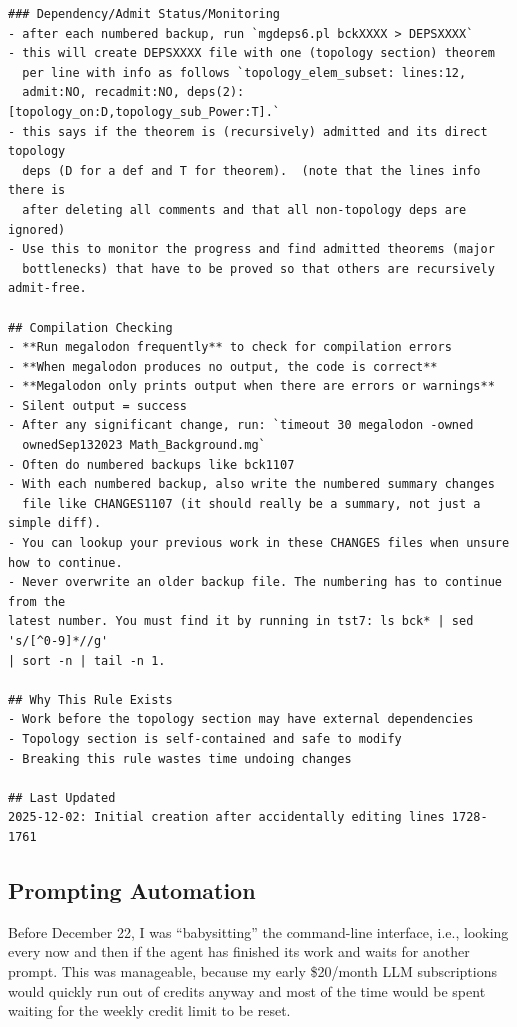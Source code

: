 \documentclass[a4paper,UKenglish,cleveref, autoref, thm-restate]{lipics-v2021}
\begin{document}
\begin{small}
\begin{verbatim}
### Dependency/Admit Status/Monitoring
- after each numbered backup, run `mgdeps6.pl bckXXXX > DEPSXXXX`
- this will create DEPSXXXX file with one (topology section) theorem
  per line with info as follows `topology_elem_subset: lines:12,
  admit:NO, recadmit:NO, deps(2):[topology_on:D,topology_sub_Power:T].`
- this says if the theorem is (recursively) admitted and its direct topology
  deps (D for a def and T for theorem).  (note that the lines info there is
  after deleting all comments and that all non-topology deps are ignored)
- Use this to monitor the progress and find admitted theorems (major
  bottlenecks) that have to be proved so that others are recursively admit-free.

## Compilation Checking
- **Run megalodon frequently** to check for compilation errors
- **When megalodon produces no output, the code is correct**
- **Megalodon only prints output when there are errors or warnings**
- Silent output = success
- After any significant change, run: `timeout 30 megalodon -owned
  ownedSep132023 Math_Background.mg`
- Often do numbered backups like bck1107
- With each numbered backup, also write the numbered summary changes
  file like CHANGES1107 (it should really be a summary, not just a simple diff).
- You can lookup your previous work in these CHANGES files when unsure how to continue.
- Never overwrite an older backup file. The numbering has to continue from the
latest number. You must find it by running in tst7: ls bck* | sed 's/[^0-9]*//g'
| sort -n | tail -n 1.

## Why This Rule Exists
- Work before the topology section may have external dependencies
- Topology section is self-contained and safe to modify
- Breaking this rule wastes time undoing changes

## Last Updated
2025-12-02: Initial creation after accidentally editing lines 1728-1761
\end{verbatim}
\end{small}  

\subsection{Prompting Automation}
Before December 22, I was ``babysitting'' the command-line interface, i.e.,
looking every now and then if the agent has finished its work and waits for
another prompt. This was manageable, because my early \$20/month LLM
subscriptions would quickly run out of credits anyway and most of the time would
be spent waiting for the weekly credit limit to be reset.
\end{document}
